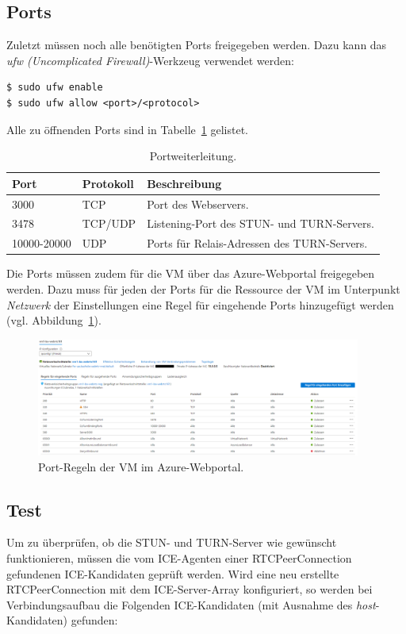 \subsection{Ports}
Zuletzt müssen noch alle benötigten Ports freigegeben werden. Dazu kann das \textit{ufw (Uncomplicated Firewall)}-Werkzeug verwendet werden:
\lstset{style=STYLE_COMMAND_LINE_ARGUMENT_SINGLE_LINE}
\begin{lstlisting}[belowskip=-0.8 \baselineskip]
$ sudo ufw enable
$ sudo ufw allow <port>/<protocol>
\end{lstlisting}

Alle zu öffnenden Ports sind in Tabelle~\ref{table:ports} gelistet.

\begin{table}[ht]
\centering
\begin{tabularx}{\textwidth}{llX}
\toprule
Port&Protokoll&Beschreibung\\
\midrule
3000&TCP&Port des Webservers.\\
3478&TCP/UDP&Listening-Port des STUN- und TURN-Servers.\\
10000-20000&UDP&Ports für Relais-Adressen des TURN-Servers.\\
\bottomrule

\end{tabularx}
\caption{Portweiterleitung.}
\label{table:ports}
\end{table}

Die Ports müssen zudem für die \acs{VM} über das Azure-Webportal freigegeben werden. Dazu muss für jeden der Ports für die Ressource der VM im Unterpunkt \textit{Netzwerk} der Einstellungen eine Regel für eingehende Ports hinzugefügt werden (vgl. Abbildung~\ref{fig:azurevmconfig}).

\begin{figure}[ht]
\centering
\includegraphics[width=0.95\textwidth]{bilder/azure-vm-network-config.png}
\caption{Port-Regeln der VM im Azure-Webportal.}
\label{fig:azurevmconfig}
\end{figure}

\subsection{Test}
Um zu überprüfen, ob die STUN- und TURN-Server wie gewünscht funktionieren, müssen die vom ICE-Agenten einer RTCPeerConnection gefundenen ICE-Kandidaten geprüft werden. Wird eine neu erstellte RTCPeerConnection mit dem ICE-Server-Array konfiguriert, so werden bei Verbindungsaufbau die Folgenden ICE-Kandidaten (mit Ausnahme des \textit{host}-Kandidaten) gefunden:


